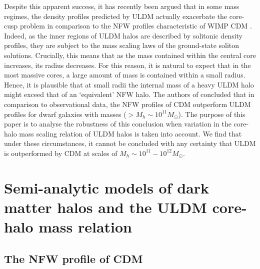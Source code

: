 \documentclass[a4paper,11pt]{article}
\begin{document}
Despite this apparent success, it has recently been argued that in some mass regimes, the density profiles predicted by ULDM actually exacerbate the core-cusp problem in comparison to the NFW profiles characteristic of WIMP CDM \cite{Robles:2018fur}. Indeed, as the inner regions of ULDM halos are described by solitonic density profiles, they are subject to the mass scaling laws of the ground-state soliton solutions. Crucially, this means that as the mass contained within the central core increases, its radius decreases. For this reason, it is natural to expect that in the most massive cores, a large amount of mass is contained within a small radius. Hence, it is plausible that at small radii the internal mass of a heavy ULDM halo might exceed that of an `equivalent' NFW halo. The authors of \cite{Robles:2018fur} concluded that in comparison to observational data, the NFW profiles of CDM outperform ULDM profiles for dwarf galaxies with masses ($> M_h \sim 10^{11} M_{\odot}$). The purpose of this paper is to analyse the robustness of this conclusion when variation in the core-halo mass scaling relation of ULDM halos is taken into account. We find that under these circumstances, it cannot be concluded with any certainty that ULDM is outperformed by CDM at scales of $M_h \sim 10^{11}-10^{12} M_{\odot}$.

\section{Semi-analytic models of dark matter halos and the ULDM core-halo mass relation}

\subsection{The NFW profile of CDM}
\end{document}
